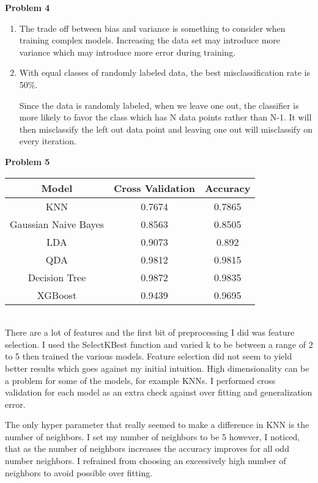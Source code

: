 \documentclass[11pt,letterpaper]{article}
\begin{document}
\textbf{Problem 4}
\begin{enumerate}[labelindent=0pt]
\item 
	The trade off between bias and variance is something to consider when
training complex models.  Increasing the data set may introduce more variance
which may introduce more error during training.  

\item
With equal classes of randomly labeled data, the best misclassification rate is
50\%.

Since the data is randomly labeled, when we leave one out, the classifier is more
likely to favor the class which has N data points rather than N-1.  It will then
misclassify the left out data point and leaving one out will misclassify on
every iteration.

\end{enumerate}
\textbf{Problem 5}
\begin{table}[h!]
\begin{tabular}{|c|c|c|}
\hline
Model & Cross Validation & Accuracy \\ \hline
KNN & 0.7674 & 0.7865 \\ \hline
Gaussian Naive Bayes & 0.8563 & 0.8505 \\ \hline
LDA & 0.9073 & 0.892 \\ \hline
QDA & 0.9812 & 0.9815 \\ \hline
Decision Tree & 0.9872 & 0.9835 \\ \hline
XGBoost & 0.9439 & 0.9695 \\ \hline
\end{tabular}
\end{table}
\\
There are a lot of features and the first bit of preprocessing I did was feature
selection.  I used the SelectKBest function and varied k to be between a range
of 2 to 5 then trained the various models.  Feature selection did not seem to
yield better results which goes against my initial intuition.  High
dimensionality can be a problem for some of the models, for example KNNs.  I
performed cross validation for each model as an extra check against over fitting
and generalization error.  

The only hyper parameter that really seemed to make a difference in KNN is the
number of neighbors. I set my number of neighbors to be 5 however, I noticed,
that as the number of neighbors increases the accuracy improves for all odd
number neighbors.  I refrained from choosing an excessively high number of
neighbors to avoid possible over fitting.
\end{document}
